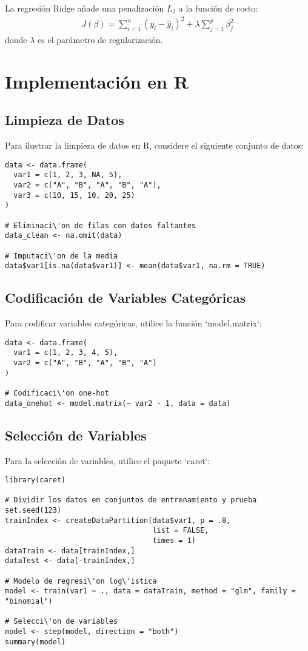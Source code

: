 \documentclass[a4paper]{report} %
\begin{document}
La regresi\'on Ridge a\~nade una penalizaci\'on $L_2$ a la funci\'on de costo:
\begin{eqnarray*}
J(\beta) = \sum_{i=1}^{n} (y_i - \hat{y}_i)^2 + \lambda \sum_{j=1}^{p} \beta_j^2
\end{eqnarray*}
donde $\lambda$ es el par\'ametro de regularizaci\'on.

\section{Implementaci\'on en R}

\subsection{Limpieza de Datos}

Para ilustrar la limpieza de datos en R, considere el siguiente conjunto de datos:
\begin{verbatim}
data <- data.frame(
  var1 = c(1, 2, 3, NA, 5),
  var2 = c("A", "B", "A", "B", "A"),
  var3 = c(10, 15, 10, 20, 25)
)

# Eliminaci\'on de filas con datos faltantes
data_clean <- na.omit(data)

# Imputaci\'on de la media
data$var1[is.na(data$var1)] <- mean(data$var1, na.rm = TRUE)
\end{verbatim}

\subsection{Codificaci\'on de Variables Categ\'oricas}

Para codificar variables categ\'oricas, utilice la funci\'on `model.matrix`:
\begin{verbatim}
data <- data.frame(
  var1 = c(1, 2, 3, 4, 5),
  var2 = c("A", "B", "A", "B", "A")
)

# Codificaci\'on one-hot
data_onehot <- model.matrix(~ var2 - 1, data = data)
\end{verbatim}

\subsection{Selecci\'on de Variables}

Para la selecci\'on de variables, utilice el paquete `caret`:
\begin{verbatim}
library(caret)

# Dividir los datos en conjuntos de entrenamiento y prueba
set.seed(123)
trainIndex <- createDataPartition(data$var1, p = .8, 
                                  list = FALSE, 
                                  times = 1)
dataTrain <- data[trainIndex,]
dataTest <- data[-trainIndex,]

# Modelo de regresi\'on log\'istica
model <- train(var1 ~ ., data = dataTrain, method = "glm", family = "binomial")

# Selecci\'on de variables
model <- step(model, direction = "both")
summary(model)
\end{verbatim}
\end{document}
